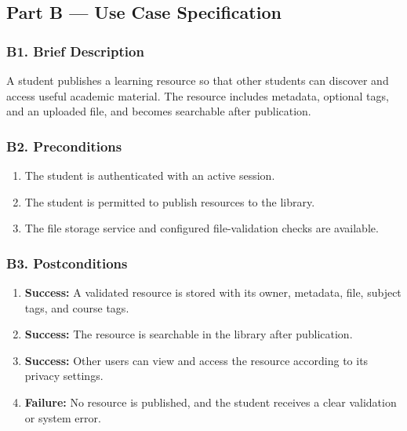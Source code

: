 \documentclass[12pt]{article}
\begin{document}
\hypertarget{sec:part-b-use-case-specification}{}
\subsection*{Part B --- Use Case Specification}
\par\medskip

\hypertarget{sec:b1-brief-description}{}
\subsubsection*{B1. Brief Description}
\par\medskip

A student publishes a learning resource so that other students can discover and access useful academic material. The resource includes metadata, optional tags, and an uploaded file, and becomes searchable after publication.
\par\medskip

\hypertarget{sec:b2-preconditions}{}
\subsubsection*{B2. Preconditions}
\par\medskip

\begin{enumerate}
\item The student is authenticated with an active session.
\item The student is permitted to publish resources to the library.
\item The file storage service and configured file-validation checks are available.
\end{enumerate}
\par\medskip

\hypertarget{sec:b3-postconditions}{}
\subsubsection*{B3. Postconditions}
\par\medskip

\begin{enumerate}
\item \textbf{Success:} A validated resource is stored with its owner, metadata, file, subject tags, and course tags.
\item \textbf{Success:} The resource is searchable in the library after publication.
\item \textbf{Success:} Other users can view and access the resource according to its privacy settings.
\item \textbf{Failure:} No resource is published, and the student receives a clear validation or system error.
\end{enumerate}
\par\medskip
\end{document}
